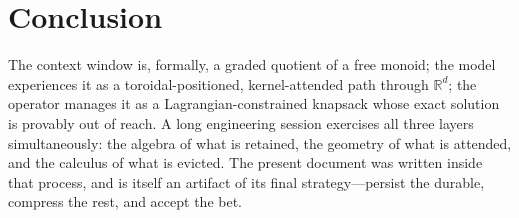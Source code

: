 \documentclass[11pt]{article}
\begin{document}
\section{Conclusion}

The context window is, formally, a graded quotient of a free monoid; the
model experiences it as a toroidal-positioned, kernel-attended path through
$\mathbb{R}^d$; the operator manages it as a Lagrangian-constrained knapsack
whose exact solution is provably out of reach. A long engineering session
exercises all three layers simultaneously: the algebra of what is retained,
the geometry of what is attended, and the calculus of what is evicted. The
present document was written inside that process, and is itself an artifact
of its final strategy---persist the durable, compress the rest, and accept
the bet.
\end{document}
